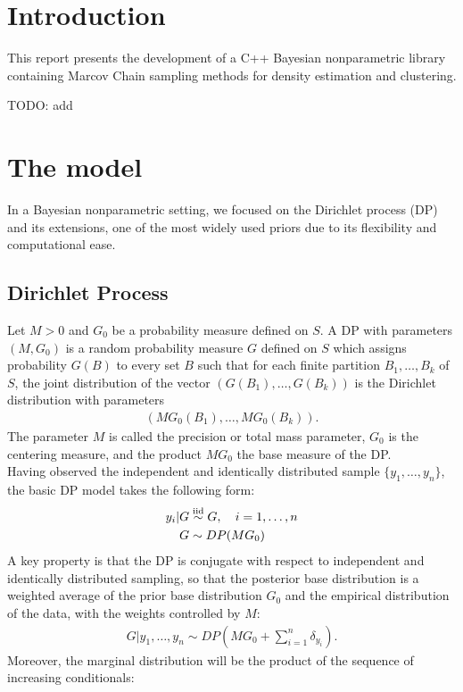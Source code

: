 \section{Introduction}
This report presents the development of a C++ Bayesian nonparametric library containing Marcov Chain sampling methods for density estimation and clustering. 

TODO: add

\section{The model}
In a Bayesian nonparametric setting, we focused on the Dirichlet process (DP) and its extensions, one of the most widely used priors due to its flexibility and computational ease.

\subsection{Dirichlet Process}
Let $M>0$ and $G_0$ be a probability measure defined on $S$. A DP with parameters $(M,G_0)$ is a random probability measure $G$ defined on $S$ which assigns probability $G(B)$ to every set $B$ such that for each finite partition ${B_1,\dots,B_k}$ of $S$, the joint distribution of the  vector $(G(B_1),\dots,G(B_k))$ is the Dirichlet distribution with parameters
\begin{align*}
(MG_0(B_1),\dots,MG_0(B_k)).
\end{align*}
The parameter $M$ is called the precision or total mass parameter, $G_0$ is
the centering measure, and the product $MG_0$ the base measure
of the DP. \\
Having observed the independent and identically distributed sample $\{y_1,\dots,y_n\}$, the basic DP model takes the following form:
\begin{align}
		y_i | G &\stackrel{\text{iid}}{\sim} G, \quad i=1,\dots,n \\
		G &\sim DP(MG_0)
\end{align}
A key property is that the DP is conjugate with respect to independent and identically distributed sampling, so that the posterior base distribution is a weighted average of the prior base distribution $G_0$ and the empirical distribution of the data, with the weights controlled by $M$:
\begin{align}
	G | y_1,\dots,y_n \sim DP(M G_0 + \sum_{i=1}^n \delta_{y_i}).
\end{align}
Moreover, the marginal distribution will be the product of the sequence of increasing conditionals:
